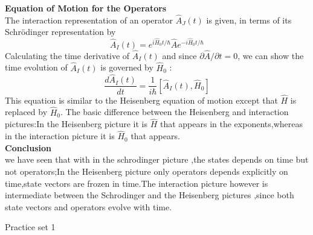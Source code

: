 \textbf{Equation of Motion for the Operators}\\
The interaction representation of an operator $\hat{A}_{J}(t)$ is given, in terms of its Schrödinger representation by
$$
\hat{A}_{I}(t)=e^{i \hat{H}_{0} t / \hbar} \hat{A} e^{-i \hat{H}_{0} t / \hbar}
$$
Calculating the time derivative of $\hat{A}_{I}(t)$ and since $\partial \hat{A} / \partial t=0$, we can show the time evolution of $\hat{A}_{I}(t)$ is governed by $\hat{H}_{0}$ :
$$
\frac{d \hat{A}_{I}(t)}{d t}=\frac{1}{i \hbar}\left[\hat{A}_{I}(t), \hat{H}_{0}\right]
$$
This equation is similar to the Heisenberg equation of motion except that $\hat{H}$ is replaced by $\hat{H}_{0}$. The basic difference between the Heisenberg and interaction pictures:In the Heisenberg picture it is $\hat{H}$ that appears in the exponents,whereas in the interaction picture it is $\hat{H}_0$ that appears.\\
\textbf{Conclusion}\\
 we have seen that with in the schrodinger picture ,the states depends on time but not operators;In the Heisenberg picture only operators depends explicitly on time,state vectors are frozen in time.The interaction picture however is intermediate between the Schrodinger and the Heisenberg pictures ,since both state vectors and operators evolve with time.\\
 \newpage
 \begin{abox}
 	Practice set 1
 	\end{abox}
